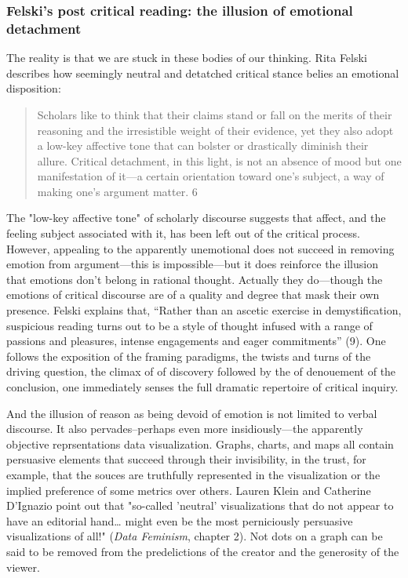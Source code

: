 \documentclass[11pt]{article}
\begin{document}
\subsubsection{Felski's post critical reading: the illusion of emotional detachment}
\label{sec:org6bec89f}
The reality is that we are stuck in these bodies of our thinking. Rita
Felski describes how seemingly neutral and detatched critical stance
belies an emotional disposition:

\begin{quote}
Scholars like to think that their claims stand or fall on the merits
of their reasoning and the irresistible weight of their evidence, yet
they also adopt a low-key affective tone that can bolster or
drastically diminish their allure. Critical detachment, in this light,
is not an absence of mood but one manifestation of it---a certain
orientation toward one's subject, a way of making one's argument
matter. 6
\end{quote}

The "low-key affective tone" of scholarly discourse suggests that
affect, and the feeling subject associated with it, has been left out
of the critical process. However, appealing to the apparently
unemotional does not succeed in removing emotion from argument---this
is impossible---but it does reinforce the illusion that emotions don't
belong in rational thought. Actually they do---though the emotions of
critical discourse are of a quality and degree that mask their own
presence. Felski explains that, “Rather than an ascetic exercise in
demystification, suspicious reading turns out to be a style of thought
infused with a range of passions and pleasures, intense engagements
and eager commitments” (9). One follows the exposition of the framing
paradigms, the twists and turns of the driving question, the climax of
of discovery followed by the of denouement of the conclusion, one
immediately senses the full dramatic repertoire of critical
inquiry. 

And the illusion of reason as being devoid of emotion is not limited
to verbal discourse. It also pervades--perhaps even more
insidiously---the apparently objective reprsentations data
visualization. Graphs, charts, and maps all contain persuasive
elements that succeed through their invisibility, in the trust, for
example, that the souces are truthfully represented in the
visualization or the implied preference of some metrics over
others. Lauren Klein and Catherine D'Ignazio point out that "so-called
'neutral' visualizations that do not appear to have an editorial
hand\ldots{} might even be the most perniciously persuasive visualizations
of all!" (\emph{Data Feminism}, chapter 2). Not dots on a graph can be said
to be removed from the predelictions of the creator and the generosity
of the viewer.
\end{document}
